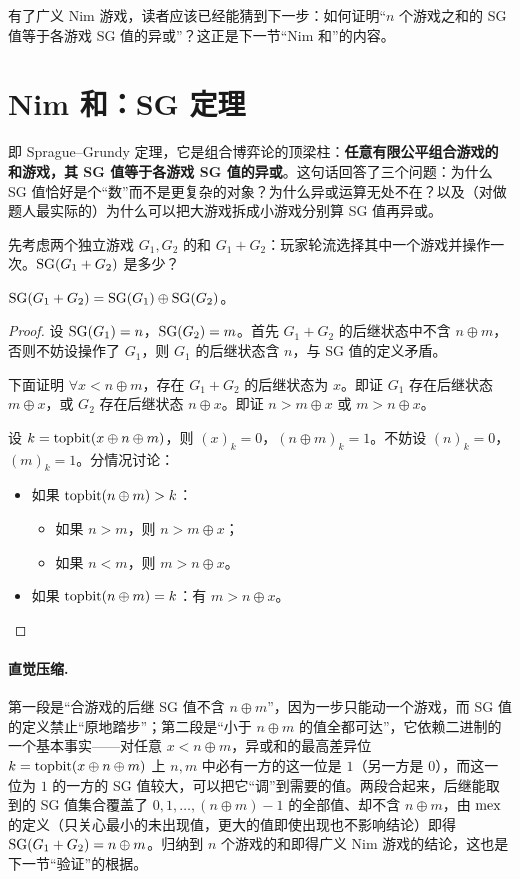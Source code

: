 有了广义 Nim 游戏，读者应该已经能猜到下一步：如何证明“$n$ 个游戏之和的 SG 值等于各游戏 SG 值的异或”？这正是下一节“Nim 和”的内容。

\section{Nim 和：SG 定理}
即 Sprague--Grundy 定理，它是组合博弈论的顶梁柱：\textbf{任意有限公平组合游戏的和游戏，其 SG 值等于各游戏 SG 值的异或}。这句话回答了三个问题：为什么 SG 值恰好是个“数”而不是更复杂的对象？为什么异或运算无处不在？以及（对做题人最实际的）为什么可以把大游戏拆成小游戏分别算 SG 值再异或。

先考虑两个独立游戏 $G_1,G_2$ 的和 $G_1+G_2$：玩家轮流选择其中一个游戏并操作一次。$\operatorname{SG}(G_1+G_2)$ 是多少？

\begin{theorem}[SG 定理]\label{thm:sgtheorem}
$\operatorname{SG}(G_1+G_2)=\operatorname{SG}(G_1)\oplus\operatorname{SG}(G_2)$。
\end{theorem}
\begin{proof}
设 $\operatorname{SG}(G_1)=n$，$\operatorname{SG}(G_2)=m$。首先 $G_1+G_2$ 的后继状态中不含 $n\oplus m$，否则不妨设操作了 $G_1$，则 $G_1$ 的后继状态含 $n$，与 SG 值的定义矛盾。

下面证明 $\forall x<n\oplus m$，存在 $G_1+G_2$ 的后继状态为 $x$。即证 $G_1$ 存在后继状态 $m\oplus x$，或 $G_2$ 存在后继状态 $n\oplus x$。即证 $n>m\oplus x$ 或 $m>n\oplus x$。

设 $k=\operatorname{topbit}(x\oplus n\oplus m)$，则 $(x)_k=0$，$(n\oplus m)_k=1$。不妨设 $(n)_k=0$，$(m)_k=1$。分情况讨论：
\begin{itemize}
\item 如果 $\operatorname{topbit}(n\oplus m)>k$：
\begin{itemize}
\item 如果 $n>m$，则 $n>m\oplus x$；
\item 如果 $n<m$，则 $m>n\oplus x$。
\end{itemize}
\item 如果 $\operatorname{topbit}(n\oplus m)=k$：有 $m>n\oplus x$。
\end{itemize}
\end{proof}

\paragraph{直觉压缩.} 第一段是“合游戏的后继 SG 值不含 $n\oplus m$”，因为一步只能动一个游戏，而 SG 值的定义禁止“原地踏步”；第二段是“小于 $n\oplus m$ 的值全都可达”，它依赖二进制的一个基本事实——对任意 $x<n\oplus m$，异或和的最高差异位 $k=\operatorname{topbit}(x\oplus n\oplus m)$ 上 $n,m$ 中必有一方的这一位是 $1$（另一方是 $0$），而这一位为 $1$ 的一方的 SG 值较大，可以把它“调”到需要的值。两段合起来，后继能取到的 SG 值集合覆盖了 $0,1,\ldots,(n\oplus m)-1$ 的全部值、却不含 $n\oplus m$，由 $\operatorname{mex}$ 的定义（只关心最小的未出现值，更大的值即使出现也不影响结论）即得 $\operatorname{SG}(G_1+G_2)=n\oplus m$。归纳到 $n$ 个游戏的和即得广义 Nim 游戏的结论，这也是下一节“验证”的根据。

